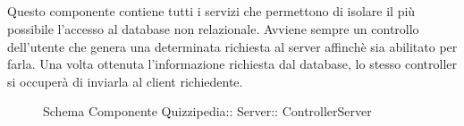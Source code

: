 \subsection{}
Questo componente contiene tutti i servizi che permettono di isolare il più possibile l'accesso al database non relazionale. Avviene sempre un controllo dell'utente che genera una determinata richiesta al server affinchè sia abilitato per farla. 
Una volta ottenuta l'informazione richiesta dal database, lo stesso controller si occuperà di inviarla al client richiedente.
\begin{figure}[H]
\centering
\noindent{}
\caption[Schema Componente ControllerServer]{Schema Componente Quizzipedia:: Server:: ControllerServer}
\end{figure}
